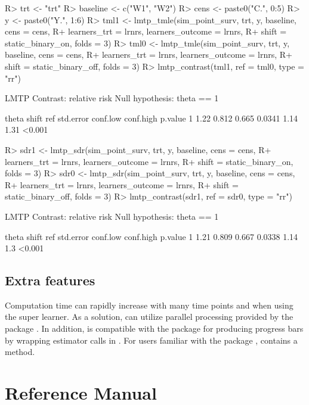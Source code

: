 \documentclass[]{jss}
\begin{document}
\begin{CodeChunk}

\begin{CodeInput}
R> trt <- "trt"
R> baseline <- c("W1", "W2")
R> cens <- paste0("C.", 0:5)
R> y <- paste0("Y.", 1:6)
R> tml1 <- lmtp_tmle(sim_point_surv, trt, y, baseline, cens = cens, 
R+                   learners_trt = lrnrs, learners_outcome = lrnrs,
R+                   shift = static_binary_on, folds = 3)
R> tml0 <- lmtp_tmle(sim_point_surv, trt, y, baseline, cens = cens, 
R+                   learners_trt = lrnrs, learners_outcome = lrnrs,
R+                   shift = static_binary_off, folds = 3)
R> lmtp_contrast(tml1, ref = tml0, type = "rr")
\end{CodeInput}

\begin{CodeOutput}
  LMTP Contrast: relative risk
Null hypothesis: theta == 1

  theta shift   ref std.error conf.low conf.high p.value
1  1.22 0.812 0.665    0.0341     1.14      1.31  <0.001
\end{CodeOutput}

\begin{CodeInput}
R> sdr1 <- lmtp_sdr(sim_point_surv, trt, y, baseline, cens = cens, 
R+                 learners_trt = lrnrs, learners_outcome = lrnrs,
R+                 shift = static_binary_on, folds = 3)
R> sdr0 <- lmtp_sdr(sim_point_surv, trt, y, baseline, cens = cens, 
R+                 learners_trt = lrnrs, learners_outcome = lrnrs,
R+                 shift = static_binary_off, folds = 3)
R> lmtp_contrast(sdr1, ref = sdr0, type = "rr")
\end{CodeInput}

\begin{CodeOutput}
  LMTP Contrast: relative risk
Null hypothesis: theta == 1

  theta shift   ref std.error conf.low conf.high p.value
1  1.21 0.809 0.667    0.0338     1.14       1.3  <0.001
\end{CodeOutput}

\end{CodeChunk}

\hypertarget{extra-features}{%
\subsection{Extra features}\label{extra-features}}

Computation time can rapidly increase with many time points and when using the super learner. As a solution,  
can utilize parallel processing provided by the  package \citep{future}. In addition, 
 is compatible with the  package \citep{progressr} for producing progress bars by wrapping estimator calls in
. For users familiar with the  package \citep{broom},  contains a  method. 

\hypertarget{reference-manual}{%
\section{Reference Manual}\label{reference-manual}}

\renewcommand\refname{References}

\end{document}
